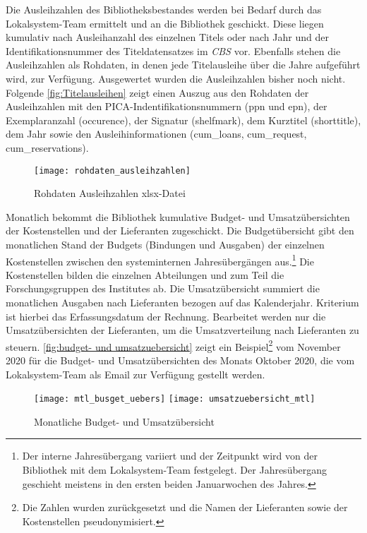 Die Ausleihzahlen des Bibliotheksbestandes werden bei Bedarf durch das Lokalsystem-Team ermittelt und an die Bibliothek geschickt. 
Diese liegen kumulativ nach Ausleihanzahl des einzelnen Titels oder nach Jahr und der Identifikationsnummer des Titeldatensatzes im 
\textit{\acrshort{CBS}} vor. Ebenfalls stehen die Ausleihzahlen als Rohdaten, in denen jede Titelausleihe über die Jahre aufgeführt wird, zur Verfügung.
Ausgewertet wurden die Ausleihzahlen bisher noch nicht. Folgende \autoref{fig:Titelausleihen} zeigt einen Auszug aus den Rohdaten der Ausleihzahlen mit 
den PICA-Indentifikationsnummern (ppn und epn), der Exemplaranzahl (occurence), der Signatur (shelfmark), dem Kurztitel (shorttitle),
dem Jahr sowie den Ausleihinformationen (cum\_loans, cum\_request, cum\_reservations).


\begin{figure}[H]
    \centering
        \texttt{[image: rohdaten\_ausleihzahlen]}
        \caption{Rohdaten Ausleihzahlen xlsx-Datei}
        \label{fig:Titelausleihen}
\end{figure}


Monatlich bekommt die Bibliothek kumulative Budget- und Umsatzübersichten der Kostenstellen und der Lieferanten zugeschickt.
Die Budgetübersicht gibt den monatlichen Stand der Budgets (Bindungen und Ausgaben) der einzelnen Kostenstellen zwischen den systeminternen Jahresübergängen aus.\footnote{ Der
interne Jahresübergang variiert und der Zeitpunkt wird von der Bibliothek mit dem Lokalsystem-Team festgelegt. Der Jahresübergang geschieht meistens in den ersten beiden Januarwochen des Jahres.}
Die Kostenstellen bilden die einzelnen Abteilungen und zum Teil die Forschungsgruppen des Institutes ab.
Die Umsatzübersicht summiert die monatlichen Ausgaben nach Lieferanten bezogen auf das Kalenderjahr. Kriterium ist hierbei das Erfassungsdatum der Rechnung. 
Bearbeitet werden nur die Umsatzübersichten der Lieferanten, um die Umsatzverteilung nach Lieferanten zu steuern.
\autoref{fig:budget- und umsatzuebersicht} zeigt ein Beispiel\footnote{ Die Zahlen wurden zurückgesetzt und die Namen der Lieferanten sowie der Kostenstellen pseudonymisiert.} vom November 2020 für die Budget- und Umsatzübersichten des Monats Oktober 2020, die vom Lokalsystem-Team als Email zur Verfügung gestellt werden.


\begin{figure}[h]
    \centering
        \texttt{[image: mtl\_busget\_uebers]}
        \texttt{[image: umsatzuebersicht\_mtl]}
        \caption{Monatliche Budget- und Umsatzübersicht}
        \label{fig:budget- und umsatzuebersicht}
\end{figure}

